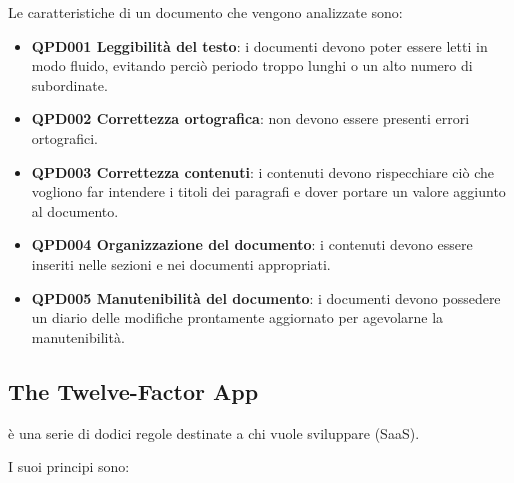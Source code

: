 		Le caratteristiche di un documento che vengono analizzate sono:
		
		\begin{itemize}
			\item \textbf{QPD001 Leggibilità del testo}: i documenti devono poter essere letti in modo fluido, evitando perciò periodo troppo lunghi o un alto numero di subordinate.
			\item \textbf{QPD002 Correttezza ortografica}: non devono essere presenti errori ortografici.
			\item \textbf{QPD003 Correttezza contenuti}: i contenuti devono rispecchiare ciò che vogliono far intendere i titoli dei paragrafi e dover portare un valore aggiunto al documento.
			\item \textbf{QPD004 Organizzazione del documento}: i contenuti devono essere inseriti nelle sezioni e nei documenti appropriati.
			\item \textbf{QPD005 Manutenibilità del documento}: i documenti devono possedere un diario delle modifiche prontamente aggiornato per agevolarne la manutenibilità.
		\end{itemize}

\subsection{The Twelve-Factor App}
 è una serie di dodici regole destinate a chi vuole sviluppare  (SaaS).

I suoi principi sono:

